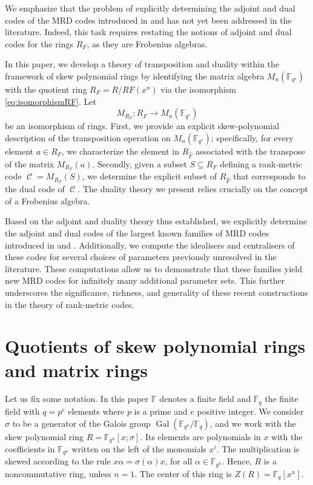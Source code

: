 \documentclass[a4paper, 11pt]{article}
\DeclareMathOperator{\C}{\mathcal{C}}
\DeclareMathOperator{\Gal}{Gal}
\newcommand{\F}{{\mathbb F}}
\begin{document}
We emphasize that the problem of explicitly determining the adjoint and dual codes of the MRD codes introduced in \cite{sheekey2020new} and \cite{lobillo2025quotients} has not yet been addressed in the literature. Indeed,
this task requires
restating the notions of adjoint and dual codes for the rings $R_F$, as
they are Frobenius algebras.



In this paper, we develop a theory of transposition and duality within the framework of skew polynomial rings by identifying the matrix algebra $M_n(\F_{q^s})$ with the quotient ring $R_F = R/RF(x^n)$ via the isomorphism \eqref{eq:isomorphismRF}. Let \[M_{R_F}:R_F \rightarrow M_n(\F_{q^s})\] be an isomorphism of rings. First, we provide an explicit skew-polynomial description of the transposition operation on $M_n(\F_{q^s})$; specifically, for every element $a \in R_F$, we characterize the element in $R_{\hat{F}}$ associated with the transpose of the matrix $M_{R_F}(a)$. Secondly, given a subset $S \subseteq R_F$ defining a rank-metric code $\C = M_{R_F}(S)$, we determine the explicit subset of $R_{\hat{F}}$ that corresponds to the dual code of $\C$. The duality theory we present relies crucially on the concept of a Frobenius algebra.

Based on the adjoint and duality theory thus established, we explicitly determine the adjoint and dual codes of the largest known families of MRD codes introduced in \cite{sheekey2020new} and \cite{lobillo2025quotients}. Additionally, we compute the idealisers and centralisers of these codes for several choices of parameters previously unresolved in the literature. These computations allow us to demonstrate that these families yield new MRD codes for infinitely many additional parameter sets. This further underscores the significance, richness, and generality of these recent constructions in the theory of rank-metric codes.





\section{Quotients of skew polynomial rings and matrix rings}



Let us fix some notation. In this paper \(\F\) denotes a finite field and \(\F_q\) the finite field with \(q = p^e\) elements where $p$ is a prime and $e$ positive integer.  We consider $\sigma$ to be a generator of the Galois group $\Gal(\mathbb{F}_{q^n}/\mathbb{F}_q)$, and we work with the skew polynomial ring $R = \mathbb{F}_{q^n}[x; \sigma]$. Its elements are polynomials in \(x\) with the coefficients in \(\F_{q^n}\) written on the left of the monomials \(x^i\). The multiplication is skewed according to the rule \(x\alpha = \sigma(\alpha)x\), for all \(\alpha \in \F_{q^n}\). Hence, \(R\) is a noncommutative ring, unless \(n = 1\). The center of this ring is \(Z(R) = \F_q[x^n]\). 
\end{document}
